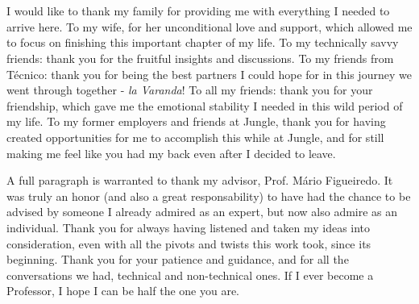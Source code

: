 \section*{\acknowledgments}


I would like to thank my family for providing me with everything I needed to
arrive here. To my wife, for her unconditional love and support, which allowed me
to focus on finishing this important chapter of my life. To my technically savvy
friends: thank you for the fruitful insights and discussions. To my friends
from Técnico: thank you for being the best partners I could hope for in this journey
we went through together - \emph{la Varanda}! To all my friends: thank you for
your friendship, which gave me the emotional stability I needed in this wild
period of my life. To my former employers and friends at Jungle, thank you
for having created opportunities for me to accomplish this while at Jungle, and
for still making me feel like you had my back even after I decided to leave.

A full paragraph is warranted to thank my advisor, Prof. Mário Figueiredo.
It was truly an honor (and also a great responsability) to have had the chance
to be advised by someone I already admired as an expert, but now also admire as
an individual. Thank you for always having listened and taken my ideas into consideration,
even with all the pivots and twists this work took, since its beginning. Thank you for
your patience and guidance, and for all the conversations we had, technical and
non-technical ones. If I ever become a Professor, I hope I can be half the one
you are.
